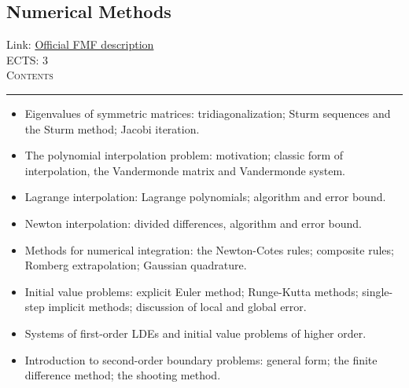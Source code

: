 \documentclass[11pt, a4paper]{article}
\newenvironment{course}[3]{
\subsection{#1}%
Link: \href{#2}{Official FMF description}\\%
ECTS: #3%
\vspace{1ex}
\\
{\large \textsc{Contents}}\\[-0.9ex]%
\rule{\textwidth}{0.5pt}
\vspace{-3ex}
}
{}
\newenvironment{chapter}[1]{
\begin{tcolorbox}[title=#1, breakable]
}
{\end{tcolorbox}}
\begin{document}
\begin{course}{Numerical Methods}{https://www.fmf.uni-lj.si/en/study-physics/programmes/1fiz/2020/7000777/courses/524/}{3}
\begin{chapter}{The eigenvalue problem}
\begin{itemize}
            \item Eigenvalues of symmetric matrices: tridiagonalization; Sturm sequences and the Sturm method; Jacobi iteration.
        
        \end{itemize}
    \end{chapter}

    \begin{chapter}{Polynomial interpolation}
        \begin{itemize}
        
            \item The polynomial interpolation problem: motivation; classic form of interpolation, the Vandermonde matrix and Vandermonde system.

            \item Lagrange interpolation: Lagrange polynomials; algorithm and error bound.

            \item Newton interpolation: divided differences, algorithm and error bound.
        
        \end{itemize}
    \end{chapter}

    \begin{chapter}{Numerical methods for ODEs}
        \begin{itemize}
        
            \item Methods for numerical integration: the Newton-Cotes rules; composite rules; Romberg extrapolation; Gaussian quadrature.

            \item Initial value problems: explicit Euler method; Runge-Kutta methods; single-step implicit methods; discussion of local and global error.

            \item Systems of first-order LDEs and initial value problems of higher order.

            \item Introduction to second-order boundary problems: general form; the finite difference method; the shooting method.
        
        \end{itemize}
    \end{chapter}

\end{course}
\end{document}
